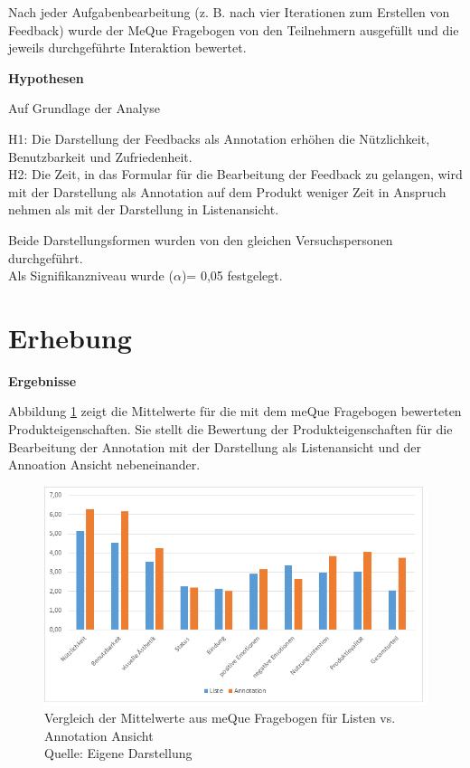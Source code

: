 Nach jeder Aufgabenbearbeitung (z. B. nach vier Iterationen zum Erstellen von Feedback) wurde der MeQue Fragebogen von den Teilnehmern ausgefüllt und die jeweils durchgeführte Interaktion bewertet. 

\textbf{Hypothesen}

Auf Grundlage der Analyse 

H1: Die Darstellung der Feedbacks als Annotation erhöhen die Nützlichkeit, Benutzbarkeit und Zufriedenheit.\\
\vspace{2mm}H2: Die Zeit, in das Formular für die Bearbeitung der Feedback zu gelangen, wird mit der Darstellung als Annotation auf dem Produkt weniger Zeit in Anspruch nehmen als mit der Darstellung in Listenansicht. 

Beide Darstellungsformen wurden von den gleichen Versuchspersonen durchgeführt.\\ 
Als Signifikanzniveau wurde ($\alpha$)= 0,05 festgelegt. 

\section{Erhebung}

\textbf{Ergebnisse}

Abbildung \ref{img:avg_meQue_listAnnotation} zeigt die Mittelwerte für die mit dem meQue Fragebogen bewerteten Produkteigenschaften. 
Sie stellt die Bewertung der Produkteigenschaften für die Bearbeitung der Annotation mit der Darstellung als Listenansicht und der Annoation Ansicht nebeneinander. 

\begin{figure}[H]
	\centering
	\includegraphics[width=1.0\textwidth]{resources/evaluation/diagrammmittel_vergleich_liste_annotation.png}
	\caption{Vergleich der Mittelwerte aus meQue Fragebogen für Listen vs. Annotation Ansicht \\Quelle:  Eigene Darstellung}
	\label{img:avg_meQue_listAnnotation}
\end{figure}

